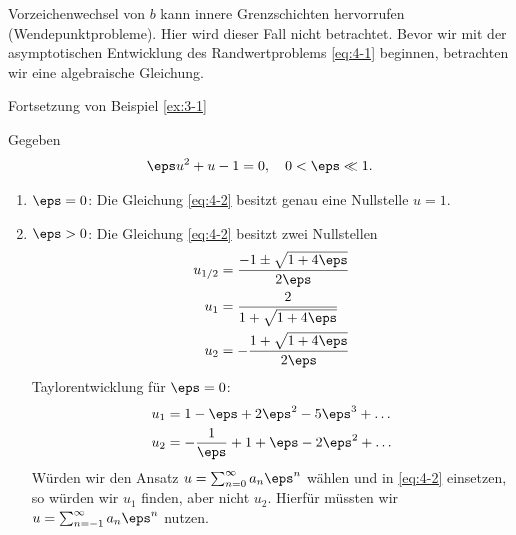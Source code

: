 Vorzeichenwechsel von $b$ kann innere Grenzschichten hervorrufen (Wendepunktprobleme). Hier wird dieser Fall nicht betrachtet. Bevor wir mit der asymptotischen Entwicklung des Randwertproblems \eqref{eq:4-1} beginnen, betrachten wir eine algebraische Gleichung. 
\begin{beispiel}\label{ex:4-2} Fortsetzung von Beispiel \ref{ex:3-1}

  Gegeben
  \begin{align}\label{eq:4-2}
    \eps u^{2} + u - 1 = 0, \quad 0 < \eps \ll 1. 
  \end{align}
  \begin{enumerate}
  \item $\eps = 0$: Die Gleichung \eqref{eq:4-2} besitzt genau eine Nullstelle $u = 1$. 
  \item $\eps > 0$: Die Gleichung \eqref{eq:4-2} besitzt zwei Nullstellen
    \begin{align*}
      u_{1/2} &= \frac{- 1 \pm \sqrt{1 + 4 \eps}}{2 \eps}\\
      u_{1} &= \frac{2}{1 + \sqrt{1 + 4 \eps}} \\
      u_{2} &= - \frac{1 + \sqrt{1 + 4 \eps}}{2 \eps} 
    \end{align*}
    Taylorentwicklung für $\eps = 0$:
    \begin{align*}
      u_{1} &= 1 - \eps + 2 \eps^{2} - 5 \eps^{3}+ \dots\\
      u_{2} &=  - \frac 1\eps + 1 + \eps - 2 \eps^{2} +  \dots
    \end{align*}
    Würden wir den Ansatz $u = \sum_{n= 0}^{\infty} a_{n} \eps^{n}$ wählen und in \eqref{eq:4-2} einsetzen, so würden wir $u_{1}$ finden, aber nicht $u_{2}$. Hierfür müssten wir $u = \sum_{n= -1}^{\infty} a_{n} \eps^{n}$ nutzen. 
  \end{enumerate}
\end{beispiel}

